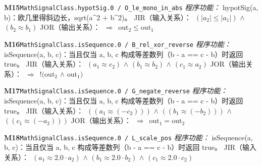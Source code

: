 \documentclass[11pt]{article}
\begin{document}
\textbf{M15}\quad \texttt{MathSignalClass.hypotSig.0 / O\_le\_mono\_in\_abs}\newline
\hspace*{1.5em}\emph{程序功能：} hypotSig(a, b)：欧几里得斜边长，sqrt(a\textasciicircum{}2 + b\textasciicircum{}2)。\newline
\hspace*{1.5em}JIR（输入关系）：\ $(|a_{2}|\leq |a_{1}|)$ $\wedge$ $(b_{2} \approx  b_{1})$\newline
\hspace*{1.5em}JOR（输出关系）：\ $\Rightarrow$\ $\mathrm{out}_{2}\leq \mathrm{out}_{1}$\par\medskip
\textbf{M16}\quad \texttt{MathSignalClass.isSequence.0 / B\_rel\_xor\_reverse}\newline
\hspace*{1.5em}\emph{程序功能：} isSequence(a, b, c)：当且仅当 a, b, c 构成等差数列（b - a == c - b）时返回 true。\newline
\hspace*{1.5em}JIR（输入关系）：\ $(a_{1} \approx  c_{2})$ $\wedge$ $(b_{1} \approx  b_{2})$ $\wedge$ $(c_{1} \approx  a_{2})$\newline
\hspace*{1.5em}JOR（输出关系）：\ $\Rightarrow$\ $!(\mathrm{out}_{2}$ $\wedge$ $\mathrm{out}_{1})$\par\medskip
\textbf{M17}\quad \texttt{MathSignalClass.isSequence.0 / G\_negate\_reverse}\newline
\hspace*{1.5em}\emph{程序功能：} isSequence(a, b, c)：当且仅当 a, b, c 构成等差数列（b - a == c - b）时返回 true。\newline
\hspace*{1.5em}JIR（输入关系）：\ $((a_{1} \approx  (-c_{2})))$ $\wedge$ $((b_{1} \approx  (-b_{2})))$ $\wedge$ $((c_{1} \approx  (-a_{2})))$\newline
\hspace*{1.5em}JOR（输出关系）：\ $\Rightarrow$\ $\mathrm{out}_{1} = \mathrm{out}_{2}$\par\medskip
\textbf{M18}\quad \texttt{MathSignalClass.isSequence.0 / L\_scale\_pos}\newline
\hspace*{1.5em}\emph{程序功能：} isSequence(a, b, c)：当且仅当 a, b, c 构成等差数列（b - a == c - b）时返回 true。\newline
\hspace*{1.5em}JIR（输入关系）：\ $(a_{1} \approx  2.0\cdot a_{2})$ $\wedge$ $(b_{1} \approx  2.0\cdot b_{2})$ $\wedge$ $(c_{1} \approx  2.0\cdot c_{2})$\newline
\end{document}
